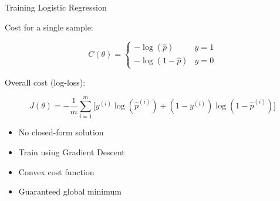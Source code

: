 \documentclass[aspectratio=169]{beamer}
\begin{document}
\begin{frame}{Training Logistic Regression}

Cost for a single sample:

\[
C(\theta)=
\begin{cases}
-\log(\hat{p}) & y=1 \\
-\log(1-\hat{p}) & y=0
\end{cases}
\]

\vspace{0.5em}

Overall cost (log-loss):

\[
J(\theta)
=
-\frac{1}{m}
\sum_{i=1}^{m}
\Big[
y^{(i)}\log(\hat{p}^{(i)})
+
(1-y^{(i)})
\log(1-\hat{p}^{(i)})
\Big]
\]

\vspace{0.5em}

\begin{itemize}
\item No closed-form solution
\item Train using Gradient Descent
\item Convex cost function
\item Guaranteed global minimum
\end{itemize}

\end{frame}

\end{document}
